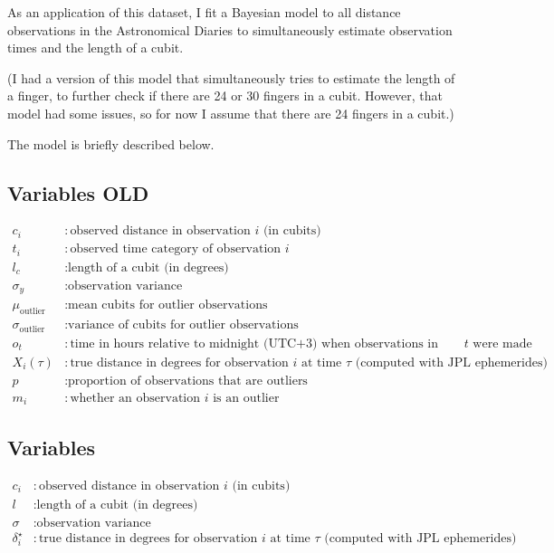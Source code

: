 \documentclass{article}
\begin{document}
As an application of this dataset, I fit a Bayesian model to all distance observations in the Astronomical Diaries to simultaneously estimate observation times and the length of a cubit.

(I had a version of this model that simultaneously tries to estimate the length of a finger, to further check if there are 24 or 30 fingers in a cubit. However, that model had some issues, so for now I assume that there are 24 fingers in a cubit.)

The model is briefly described below.

\subsection{Variables OLD}
\begin{align*}
    c_i &: \text{observed distance in observation $i$ (in cubits)} \\
    t_i &: \text{observed time category of observation $i$} \\
    l_c &: \text{length of a cubit (in degrees)} \\
    \sigma_y &: \text{observation variance} \\
    \mu_\text{outlier} &: \text{mean cubits for outlier observations} \\
    \sigma_\text{outlier} &: \text{variance of cubits for outlier observations} \\
    o_t &: \text{time in hours relative to midnight (UTC+3) when observations in category $t$ were made} \\
    X_i(\tau) &: \text{true distance in degrees for observation $i$ at time $\tau$ (computed with JPL ephemerides)} \\
    p &: \text{proportion of observations that are outliers} \\
    m_i &: \text{whether an observation $i$ is an outlier}
\end{align*}

\subsection{Variables}
\begin{align*}
    c_i &: \text{observed distance in observation $i$ (in cubits)} \\
    l &: \text{length of a cubit (in degrees)} \\
    \sigma &: \text{observation variance} \\
    \delta_i^\star &: \text{true distance in degrees for observation $i$ at time $\tau$ (computed with JPL ephemerides)}
\end{align*}
\end{document}
